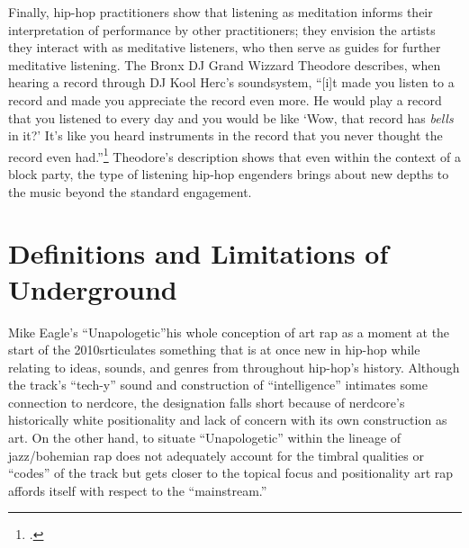 Finally, hip-hop practitioners show that listening as meditation informs their interpretation of
performance by other practitioners; they envision the artists they interact with as meditative
listeners, who then serve as guides for further meditative listening. The Bronx DJ Grand Wizzard
Theodore describes, when hearing a record through DJ Kool Herc's soundsystem, ``[i]t made you
listen to a record and made you appreciate the record even more. He would play a record that 
you listened to every day and you would be like `Wow, that record has \emph{bells} in it?' It's 
like you heard instruments in the record that you never thought the record even had.''\footnote{
\autocite[139]{christabronGlassHiphopProduction2015}.} Theodore's description shows that even
within the context of a block party, the type of listening hip-hop engenders brings about new
depths to the music beyond the standard engagement.

\section{Definitions and Limitations of Underground}

Mike Eagle's ``Unapologetic''\textemdash his whole conception of art rap as a moment at the start
of the 2010s\textemdash rticulates something that is at once new in hip-hop while relating to ideas,
sounds, and genres from throughout hip-hop's history. Although the track's ``tech-y'' sound and 
construction of ``intelligence'' intimates some connection to nerdcore, the designation falls short 
because of nerdcore's historically white positionality and lack of concern with its own construction 
as art. On the other hand, to situate ``Unapologetic'' within the lineage of jazz/bohemian rap does 
not adequately account for the  timbral qualities or ``codes'' of the track but gets closer to the 
topical focus and  positionality art rap affords itself with respect to the ``mainstream.''


